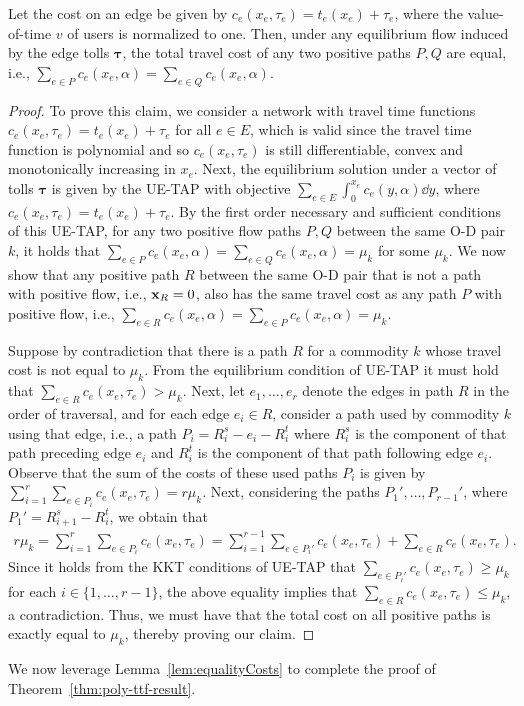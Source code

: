 \documentclass{article}
\begin{document}
\begin{lemma}  \label{lem:equalityCosts}
Let the cost on an edge be given by $c_e(x_e, \tau_e) = t_e(x_e) + \tau_e$, where the value-of-time $v$ of users is normalized to one. Then, under any equilibrium flow induced by the edge tolls $\boldsymbol{\tau}$, the total travel cost of any two positive paths $P, Q$ are equal, i.e., $\sum_{e \in P} c_e(x_e, \alpha) = \sum_{e \in Q} c_e(x_e, \alpha)$. 
\end{lemma}

\begin{proof}
To prove this claim, we consider a network with travel time functions $c_e(x_e, \tau_e) = t_e(x_e) + \tau_e$ for all $e \in E$, which is valid since the travel time function is polynomial and so $c_e(x_e, \tau_e)$ is still differentiable, convex and monotonically increasing in $x_e$. Next, the equilibrium solution under a vector of tolls $\boldsymbol{\tau}$ is given by the UE-TAP with objective $\sum_{e \in E}\int_{0}^{x_e} c_e(y, \alpha) \dd{y}$, where $c_e(x_e, \tau_e) = t_e(x_e) + \tau_e$. By the first order necessary and sufficient conditions of this UE-TAP, for any two positive flow paths $P, Q$ between the same O-D pair $k$, it holds that $\sum_{e \in P} c_e(x_e, \alpha) = \sum_{e \in Q} c_e(x_e, \alpha) = \mu_k$ for some $\mu_k$. We now show that any positive path $R$ between the same O-D pair that is not a path with positive flow, i.e., $\mathbf{x}_R = 0$, also has the same travel cost as any path $P$ with positive flow, i.e., $\sum_{e \in R} c_e(x_e, \alpha) = \sum_{e \in P} c_e(x_e, \alpha) = \mu_k$.

Suppose by contradiction that there is a path $R$ for a commodity $k$ whose travel cost is not equal to $\mu_k$. From the equilibrium condition of UE-TAP it must hold that $\sum_{e \in R} c_e(x_e, \tau_e)>\mu_k$. Next, let $e_1, \ldots, e_r$ denote the edges in path $R$ in the order of traversal, and for each edge $e_i \in R$, consider a path used by commodity $k$ using that edge, i.e., a path $P_i = R_i^s-e_i-R_i^t$ where $R_i^s$ is the component of that path preceding edge $e_i$ and $R_i^t$ is the component of that path following edge $e_i$. Observe that the sum of the costs of these used paths $P_i$ is given by $\sum_{i = 1}^r \sum_{e \in P_i} c_e(x_e, \tau_e) = r \mu_k$. Next, considering the paths $P_1', \ldots, P_{r-1}'$, where $P_1' = R_{i+1}^s-R_i^t$, we obtain that
\begin{align*}
    r \mu_k = \sum_{i = 1}^r \sum_{e \in P_i} c_e(x_e, \tau_e) = \sum_{i = 1}^{r-1} \sum_{e \in P_i'} c_e(x_e, \tau_e) + \sum_{e \in R} c_e(x_e, \tau_e).
\end{align*}
Since it holds from the KKT conditions of UE-TAP that $\sum_{e \in P_i'} c_e(x_e, \tau_e) \geq \mu_k$ for each $i \in \{1, \ldots, r-1 \}$, the above equality implies that $\sum_{e \in R} c_e(x_e, \tau_e) \leq \mu_k$, a contradiction. Thus, we must have that the total cost on all positive paths is exactly equal to $\mu_k$, thereby proving our claim.
\end{proof}
We now leverage Lemma~\ref{lem:equalityCosts} to complete the proof of Theorem~\ref{thm:poly-ttf-result}.
\end{document}
